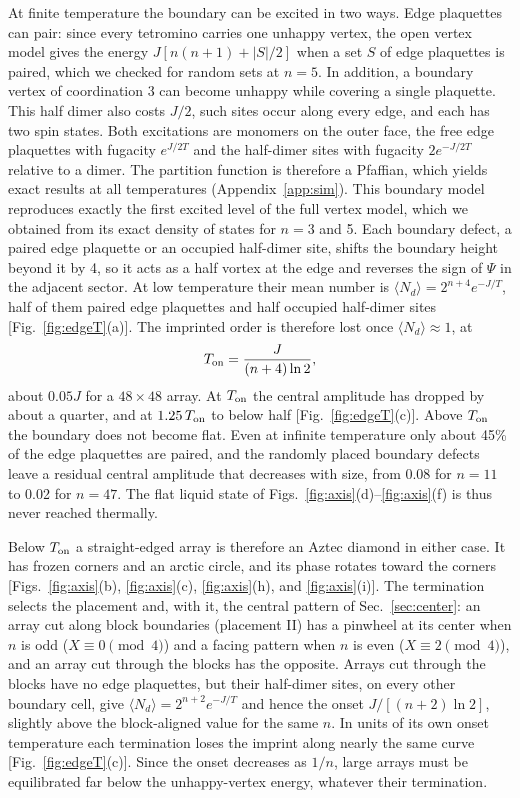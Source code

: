 \documentclass[aps,prb,twocolumn,floatfix,longbibliography]{revtex4-2}
\begin{document}
At finite temperature the boundary can be excited in two ways. Edge plaquettes can pair: since every tetromino carries one unhappy vertex, the open vertex model gives the energy $J[n(n+1)+|S|/2]$ when a set $S$ of edge plaquettes is paired, which we checked for random sets at $n=5$. In addition, a boundary vertex of coordination 3 can become unhappy while covering a single plaquette. This half dimer also costs $J/2$, such sites occur along every edge, and each has two spin states. Both excitations are monomers on the outer face, the free edge plaquettes with fugacity $e^{J/2T}$ and the half-dimer sites with fugacity $2e^{-J/2T}$ relative to a dimer. The partition function is therefore a Pfaffian, which yields exact results at all temperatures (Appendix~\ref{app:sim}). This boundary model reproduces exactly the first excited level of the full vertex model, which we obtained from its exact density of states for $n=3$ and 5. Each boundary defect, a paired edge plaquette or an occupied half-dimer site, shifts the boundary height beyond it by 4, so it acts as a half vortex at the edge and reverses the sign of $\Psi$ in the adjacent sector. At low temperature their mean number is $\langle N_d\rangle=2^{n+4}e^{-J/T}$, half of them paired edge plaquettes and half occupied half-dimer sites [Fig.~\ref{fig:edgeT}(a)]. The imprinted order is therefore lost once $\langle N_d\rangle\approx1$, at
\begin{equation}
T_{\rm on}=\frac{J}{(n+4)\ln2},
\label{eq:Ton}
\end{equation}
about $0.05J$ for a $48\times48$ array. At $T_{\rm on}$ the central amplitude has dropped by about a quarter, and at $1.25\,T_{\rm on}$ to below half [Fig.~\ref{fig:edgeT}(c)]. Above $T_{\rm on}$ the boundary does not become flat. Even at infinite temperature only about 45\% of the edge plaquettes are paired, and the randomly placed boundary defects leave a residual central amplitude that decreases with size, from 0.08 for $n=11$ to 0.02 for $n=47$. The flat liquid state of Figs.~\ref{fig:axis}(d)--\ref{fig:axis}(f) is thus never reached thermally.

Below $T_{\rm on}$ a straight-edged array is therefore an Aztec diamond in either case. It has frozen corners and an arctic circle, and its phase rotates toward the corners [Figs.~\ref{fig:axis}(b), \ref{fig:axis}(c), \ref{fig:axis}(h), and \ref{fig:axis}(i)]. The termination selects the placement and, with it, the central pattern of Sec.~\ref{sec:center}: an array cut along block boundaries (placement II) has a pinwheel at its center when $n$ is odd ($X\equiv0\pmod4$) and a facing pattern when $n$ is even ($X\equiv2\pmod4$), and an array cut through the blocks has the opposite. Arrays cut through the blocks have no edge plaquettes, but their half-dimer sites, on every other boundary cell, give $\langle N_d\rangle=2^{n+2}e^{-J/T}$ and hence the onset $J/[(n+2)\ln2]$, slightly above the block-aligned value for the same $n$. In units of its own onset temperature each termination loses the imprint along nearly the same curve [Fig.~\ref{fig:edgeT}(c)]. Since the onset decreases as $1/n$, large arrays must be equilibrated far below the unhappy-vertex energy, whatever their termination.
\end{document}
